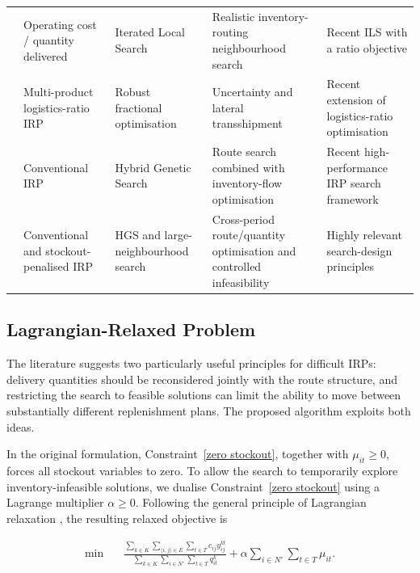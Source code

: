 \documentclass{article}
\begin{document}
\begin{table}[!htbp]
\begin{tabularx}{\textwidth}{
>{\raggedright\arraybackslash}p{2.15cm}
>{\raggedright\arraybackslash}p{2.55cm}
>{\raggedright\arraybackslash}p{2.75cm}
>{\raggedright\arraybackslash}X
>{\raggedright\arraybackslash}X}
\cite{alonsopecina2024iterated}
&
Operating cost / quantity delivered
&
Iterated Local Search
&
Realistic inventory-routing neighbourhood search
&
Recent ILS with a ratio objective
\\

\cite{man2025logistics}
&
Multi-product logistics-ratio IRP
&
Robust fractional optimisation
&
Uncertainty and lateral transshipment
&
Recent extension of logistics-ratio optimisation
\\

\cite{castro2026hybrid}
&
Conventional IRP
&
Hybrid Genetic Search
&
Route search combined with inventory-flow optimisation
&
Recent high-performance IRP search framework
\\

\cite{zhao2025large}
&
Conventional and stockout-penalised IRP
&
HGS and large-neighbourhood search
&
Cross-period route/quantity optimisation and controlled infeasibility
&
Highly relevant search-design principles
\\

\bottomrule
\end{tabularx}
\end{table}


\subsection{Lagrangian-Relaxed Problem}
\label{sec:lagrangian_relaxation}

The literature suggests two particularly useful principles for difficult IRPs:
delivery quantities should be reconsidered jointly with the route structure,
and restricting the search to feasible solutions can limit the ability to
move between substantially different replenishment plans. The proposed
algorithm exploits both ideas.

In the original formulation,
Constraint~\eqref{zero stockout}, together with
$\mu_{it}\geq0$, forces all stockout variables to zero. To allow the search
to temporarily explore inventory-infeasible solutions, we dualise
Constraint~\eqref{zero stockout} using a Lagrange multiplier
$\alpha\geq0$. Following the general principle of Lagrangian relaxation
\citep{fisher1981lagrangian}, the resulting relaxed objective is

\begin{align}
\min \quad &
\frac{
\displaystyle
\sum_{k\in K}
\sum_{\langle i,j\rangle\in E}
\sum_{t\in T}
c_{ij}y_{ij}^{kt}}
{
\displaystyle
\sum_{k\in K}
\sum_{i\in N'}
\sum_{t\in T}
q_{it}^{k}}
+
\alpha
\sum_{i\in N'}
\sum_{t\in T}
\mu_{it}.
\label{Relaxed_obj}
\end{align}
\end{document}

